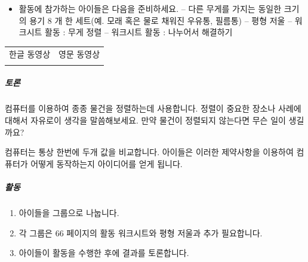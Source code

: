 \documentclass[]{article}
\begin{document}
\begin{itemize}
\itemsep1pt\parskip0pt
\item
  활동에 참가하는 아이들은 다음을 준비하세요. -- 다른 무게를 가지는
  동일한 크기의 용기 8 개 한 세트(예. 모래 혹은 물로 채워진 우유통,
  필름통) -- 평형 저울 -- 워크시트 활동 : 무게 정렬 -- 워크시트 활동 :
  나누어서 해결하기
\end{itemize}


\begin{longtable}[c]{@{}ll@{}}
\toprule
\begin{minipage}[t]{0.47\columnwidth}\raggedright\strut
한글 동영상
\strut\end{minipage} &
\begin{minipage}[t]{0.47\columnwidth}\raggedright\strut
영문 동영상
\strut\end{minipage}\tabularnewline
\begin{minipage}[t]{0.47\columnwidth}\raggedright\strut
\strut\end{minipage} &
\begin{minipage}[t]{0.47\columnwidth}\raggedright\strut
\strut\end{minipage}\tabularnewline
\bottomrule
\end{longtable}

\subparagraph{토론}\label{section-107}

컴퓨터를 이용하여 종종 물건을 정렬하는데 사용합니다. 정렬이 중요한
장소나 사례에 대해서 자유로이 생각을 말씀해보세요. 만약 물건이 정렬되지
않는다면 무슨 일이 생길까요?

컴퓨터는 통상 한번에 두개 값을 비교합니다. 아이들은 이러한 제약사항을
이용하여 컴퓨터가 어떻게 동작하는지 아이디어를 얻게 됩니다.

\subparagraph{활동}\label{section-108}

\begin{enumerate}
\item
  아이들을 그룹으로 나눕니다.
\item
  각 그룹은 66 페이지의 활동 워크시트와 평형 저울과 추가 필요합니다.
\item
  아이들이 활동을 수행한 후에 결과를 토론합니다.
\end{enumerate}
\end{document}
